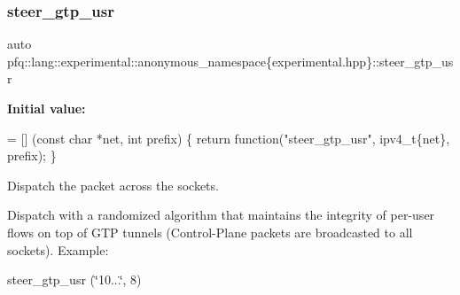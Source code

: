 \subsubsection{\texorpdfstring{steer\+\_\+gtp\+\_\+usr}{steer\_gtp\_usr}}
{\footnotesize\ttfamily auto pfq\+::lang\+::experimental\+::anonymous\+\_\+namespace\{experimental.\+hpp\}\+::steer\+\_\+gtp\+\_\+usr}

{\bfseries Initial value\+:}
\begin{DoxyCode}
= [] (\textcolor{keyword}{const} \textcolor{keywordtype}{char} *net, \textcolor{keywordtype}{int} prefix)
        \{
            \textcolor{keywordflow}{return} \textcolor{keyword}{function}(\textcolor{stringliteral}{"steer\_gtp\_usr"}, ipv4\_t\{net\}, prefix);
        \}
\end{DoxyCode}


Dispatch the packet across the sockets. 

Dispatch with a randomized algorithm that maintains the integrity of per-\/user flows on top of G\+TP tunnels (Control-\/\+Plane packets are broadcasted to all sockets). Example\+:

steer\+\_\+gtp\+\_\+usr (\char`\"{}10...\char`\"{}, 8) 